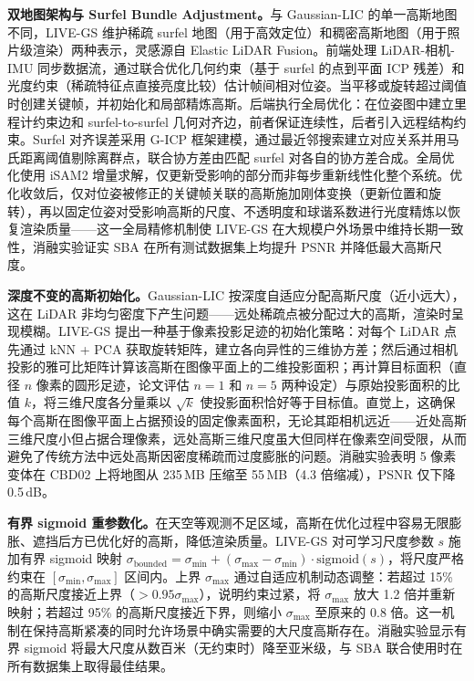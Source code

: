 \textbf{双地图架构与 Surfel Bundle Adjustment。}与 Gaussian-LIC 的单一高斯地图不同，LIVE-GS 维护稀疏 surfel 地图（用于高效定位）和稠密高斯地图（用于照片级渲染）两种表示，灵感源自 Elastic LiDAR Fusion。前端处理 LiDAR-相机-IMU 同步数据流，通过联合优化几何约束（基于 surfel 的点到平面 ICP 残差）和光度约束（稀疏特征点直接亮度比较）估计帧间相对位姿。当平移或旋转超过阈值时创建关键帧，并初始化和局部精炼高斯。后端执行全局优化：在位姿图中建立里程计约束边和 surfel-to-surfel 几何对齐边，前者保证连续性，后者引入远程结构约束。Surfel 对齐误差采用 G-ICP 框架建模，通过最近邻搜索建立对应关系并用马氏距离阈值剔除离群点，联合协方差由匹配 surfel 对各自的协方差合成。全局优化使用 iSAM2 增量求解，仅更新受影响的部分而非每步重新线性化整个系统。优化收敛后，仅对位姿被修正的关键帧关联的高斯施加刚体变换（更新位置和旋转），再以固定位姿对受影响高斯的尺度、不透明度和球谐系数进行光度精炼以恢复渲染质量——这一全局精修机制使 LIVE-GS 在大规模户外场景中维持长期一致性，消融实验证实 SBA 在所有测试数据集上均提升 PSNR 并降低最大高斯尺度。

\textbf{深度不变的高斯初始化。}Gaussian-LIC 按深度自适应分配高斯尺度（近小远大），这在 LiDAR 非均匀密度下产生问题——远处稀疏点被分配过大的高斯，渲染时呈现模糊。LIVE-GS 提出一种基于像素投影足迹的初始化策略：对每个 LiDAR 点先通过 kNN + PCA 获取旋转矩阵，建立各向异性的三维协方差；然后通过相机投影的雅可比矩阵计算该高斯在图像平面上的二维投影面积；再计算目标面积（直径 $n$ 像素的圆形足迹，论文评估 $n{=}1$ 和 $n{=}5$ 两种设定）与原始投影面积的比值 $k$，将三维尺度各分量乘以 $\sqrt{k}$ 使投影面积恰好等于目标值。直觉上，这确保每个高斯在图像平面上占据预设的固定像素面积，无论其距相机远近——近处高斯三维尺度小但占据合理像素，远处高斯三维尺度虽大但同样在像素空间受限，从而避免了传统方法中远处高斯因密度稀疏而过度膨胀的问题。消融实验表明 5 像素变体在 CBD02 上将地图从 235\,MB 压缩至 55\,MB（4.3 倍缩减），PSNR 仅下降 0.5\,dB。

\textbf{有界 sigmoid 重参数化。}在天空等观测不足区域，高斯在优化过程中容易无限膨胀、遮挡后方已优化好的高斯，降低渲染质量。LIVE-GS 对可学习尺度参数 $s$ 施加有界 sigmoid 映射 $\sigma_{\text{bounded}} = \sigma_{\min} + (\sigma_{\max} - \sigma_{\min}) \cdot \text{sigmoid}(s)$，将尺度严格约束在 $[\sigma_{\min}, \sigma_{\max}]$ 区间内。上界 $\sigma_{\max}$ 通过自适应机制动态调整：若超过 15\% 的高斯尺度接近上界（$>0.95\sigma_{\max}$），说明约束过紧，将 $\sigma_{\max}$ 放大 1.2 倍并重新映射；若超过 95\% 的高斯尺度接近下界，则缩小 $\sigma_{\max}$ 至原来的 0.8 倍。这一机制在保持高斯紧凑的同时允许场景中确实需要的大尺度高斯存在。消融实验显示有界 sigmoid 将最大尺度从数百米（无约束时）降至亚米级，与 SBA 联合使用时在所有数据集上取得最佳结果。


